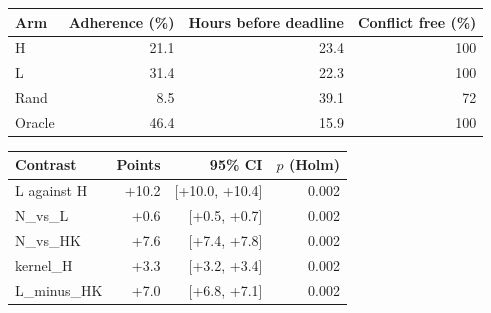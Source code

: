 \begin{tabular}{lrrr}
\hline
Arm & Adherence (\%) & Hours before deadline & Conflict free (\%) \\
\hline
H & 21.1 & 23.4 & 100 \\
L & 31.4 & 22.3 & 100 \\
Rand & 8.5 & 39.1 & 72 \\
Oracle & 46.4 & 15.9 & 100 \\
\hline
\end{tabular}

\begin{tabular}{lrrr}
\hline
Contrast & Points & 95\% CI & $p$ (Holm) \\
\hline
L against H & +10.2 & [+10.0, +10.4] & 0.002 \\
N_vs_L & +0.6 & [+0.5, +0.7] & 0.002 \\
N_vs_HK & +7.6 & [+7.4, +7.8] & 0.002 \\
kernel_H & +3.3 & [+3.2, +3.4] & 0.002 \\
L_minus_HK & +7.0 & [+6.8, +7.1] & 0.002 \\
\hline
\end{tabular}
